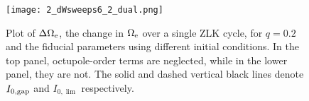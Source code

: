 \documentclass[
        fleqn,
        usenatbib,
    ]{mnras}
\begin{document}
\begin{figure}
    \centering
    \texttt{[image: 2\_dWsweeps6\_2\_dual.png]}
    \caption{Plot of $\Delta \Omega_{\rm e}$, the change in $\Omega_{\rm e}$
    over a single ZLK cycle, for $q = 0.2$ and the fiducial parameters using
    different initial conditions. In the top panel, octupole-order terms are
    neglected, while in the lower panel, they are not. The solid and dashed
    vertical black lines denote $I_{\rm 0, gap}$ and $I_{0, \lim}$
    respectively.}\label{fig:dW}
\end{figure}

\label{lastpage} %
\end{document}
